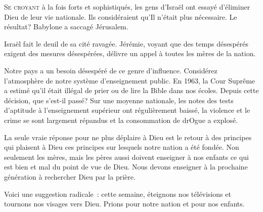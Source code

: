 




\lettrine{S}{e croyant} à la fois forts et sophistiqués,
 les gens d'Israël ont essayé d'éliminer Dieu de leur vie nationale.
 Ils considéraient qu'Il n'était plus nécessaire.
 Le résultat? Babylone a saccagé Jérusalem. 

Israël fait le deuil de sa cité ravagée.
 Jérémie, voyant que des temps désespérés exigent des mesures
 désespérées, délivre un appel à toutes les mères de la nation. 


Notre pays a un besoin désespéré de ce genre d'influence.
 Considérez l'atmosphère de notre système d'enseignement public.
 En 1963, la Cour Suprême a estimé qu'il était illégal de prier
 ou de lire la Bible dans nos écoles.
 Depuis cette décision, que s'est-il passé?
 Sur une moyenne nationale, les notes des tests d'aptitude
 à l'enseignement supérieur ont régulièrement baissé,
 la violence et le crime se sont largement répandus
 et la consommation de drOgue a explosé. 

La seule vraie réponse pour ne plus déplaire à Dieu
 est le retour à des principes qui plaisent à Dieu
 \ocadr ces principes sur lesquels notre nation a été fondée.
 Non seulement les mères, mais les pères aussi doivent enseigner
 à nos enfants ce qui est bien et mal \ocadr du point de vue de Dieu.
 Nous devons enseigner à la prochaine génération à rechercher Dieu
 par la prière. 

Voici une suggestion radicale~: cette semaine, éteignons nos télévisions
 et tournons nos visages vers Dieu.
 Prions pour notre nation et pour nos enfants. 

